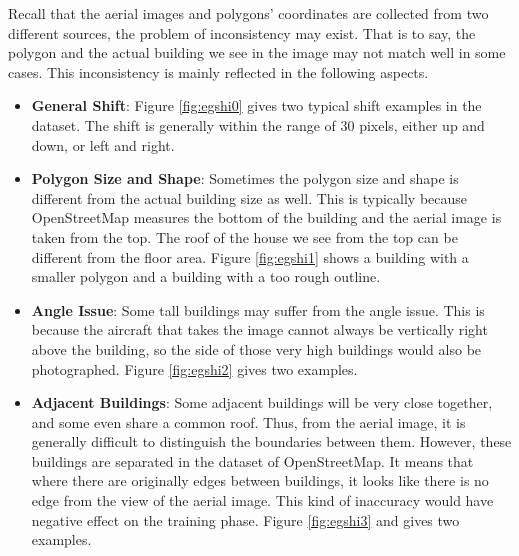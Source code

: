 Recall that the aerial images and polygons' coordinates are collected from two different sources, the problem of inconsistency may exist. That is to say, the polygon and the actual building we see in the image may not match well in some cases. This inconsistency is mainly reflected in the following aspects.

\begin{itemize}
	\item \textbf{General Shift}: Figure \ref{fig:egshi0} gives two typical shift examples in the dataset. The shift is generally within the range of 30 pixels, either up and down, or left and right.
	\item \textbf{Polygon Size and Shape}: Sometimes the polygon size and shape is different from the actual building size as well. This is typically because OpenStreetMap measures the bottom of the building and the aerial image is taken from the top. The roof of the house we see from the top can be different from the floor area. Figure \ref{fig:egshi1} shows a building with a smaller polygon and a building with a too rough outline.
	\item \textbf{Angle Issue}: Some tall buildings may suffer from the angle issue. This is because the aircraft that takes the image cannot always be vertically right above the building, so the side of those very high buildings would also be photographed. Figure \ref{fig:egshi2} gives two examples.
	\item \textbf{Adjacent Buildings}: Some adjacent buildings will be very close together, and some even share a common roof. Thus, from the aerial image, it is generally difficult to distinguish the boundaries between them. However, these buildings are separated in the dataset of OpenStreetMap. It means that where there are originally edges between buildings, it looks like there is no edge from the view of the aerial image. This kind of inaccuracy would have negative effect on the training phase. Figure \ref{fig:egshi3} and gives two examples.
\end{itemize}

